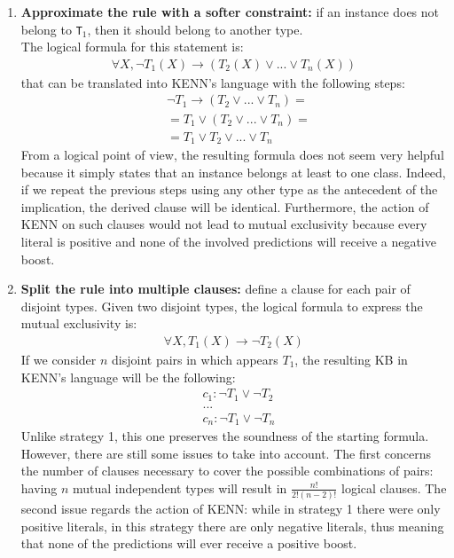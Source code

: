 \begin{enumerate}
    \item \textbf{Approximate the rule with a softer constraint:} if an instance does not belong to \texttt{T$_1$}, then it should belong to another type. \\
    The logical formula for this statement is:
    \begin{gather*}
            \forall X, \neg T_{1}(X) \to (T_{2}(X) \vee ... \vee T_{n}(X))
    \end{gather*}
    that can be translated into KENN's language with the following steps:
    \begin{align*}
        & \neg T_{1} \to (T_{2} \vee ... \vee T_{n}) = \\
        & = T_{1} \vee (T_{2} \vee ... \vee T_{n}) = \\
        & = T_{1} \vee T_{2} \vee ... \vee T_{n}
    \end{align*}
    From a logical point of view, the resulting formula does not seem very helpful because it simply states that an instance belongs at least to one class. Indeed, if we repeat the previous steps using any other type as the antecedent of the implication, the derived clause will be identical. Furthermore, the action of KENN on such clauses would not lead to mutual exclusivity because every literal is positive and none of the involved predictions will receive a negative boost.
    
    \item \textbf{Split the rule into multiple clauses:} define a clause for each pair of disjoint types.
    Given two disjoint types, the logical formula to express the mutual exclusivity is:
    \begin{gather*}
        \forall X, T_{1}(X) \to \neg T_{2}(X)
    \end{gather*}
    If we consider $n$ disjoint pairs in which appears $T_{1}$, the resulting KB in KENN's language will be the following:
    \begin{align*}
        & c_{1}: \neg T_{1} \vee \neg T_{2}\\
        & ...\\
        & c_{n}: \neg T_{1} \vee \neg T_{n}
    \end{align*}
    Unlike strategy 1, this one preserves the soundness of the starting formula. However, there are still some issues to take into account. The first concerns the number of clauses necessary to cover the possible combinations of pairs: having $ n $ mutual independent types will result in $ \frac{n!}{2!(n-2)!} $ logical clauses. The second issue regards the action of KENN: while in strategy 1 there were only positive literals, in this strategy there are only negative literals, thus meaning that none of the predictions will ever receive a positive boost.
\end{enumerate}

